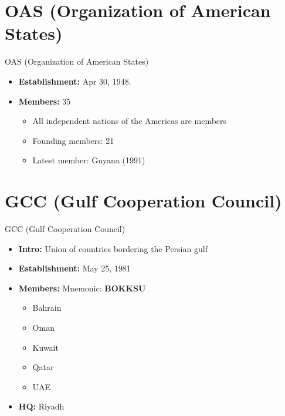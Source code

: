 \documentclass[
  12pt,
  ignorenonframetext,
  progressbar=frametitle]{beamer}
\providecommand{\tightlist}{%
  \setlength{\itemsep}{0pt}\setlength{\parskip}{0pt}}
\begin{document}
\section{OAS (Organization of American States)}
\begin{frame}[allowframebreaks]
{OAS (Organization of American States)}
\protect\hypertarget{oas-organization-of-american-states}{}
\begin{itemize}
\tightlist
\item
  \textbf{Establishment:} Apr 30, 1948.
\item
  \textbf{Members:} 35

  \begin{itemize}
  \tightlist
  \item
    All independent nations of the Americas are members
  \item
    Founding members: 21
  \item
    Latest member: Guyana (1991)
  \end{itemize}
\end{itemize}
\end{frame}

\section{GCC (Gulf Cooperation Council)}
\begin{frame}[allowframebreaks]
{GCC (Gulf Cooperation Council)}
\protect\hypertarget{gcc-gulf-cooperation-council}{}
\begin{itemize}
\tightlist
\item
  \textbf{Intro:} Union of countries bordering the Persian gulf
\item
  \textbf{Establishment:} May 25, 1981
\item
  \textbf{Members:} Mnemonic: \textbf{BOKKSU}

  \begin{itemize}
  \tightlist
  \item
    Bahrain
  \item
    Oman
  \item
    Kuwait
  \item
    Qatar
  \item
    UAE
  \end{itemize}
\item
  \textbf{HQ:} Riyadh
\end{itemize}
\end{frame}
\end{document}
